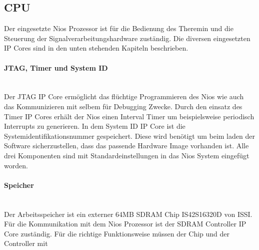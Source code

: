 \subsection{CPU}\label{subsec:CPU}
Der eingesetzte Nios Prozessor ist für die Bedienung des Theremin und die Steuerung der Signalverarbeitungshardware zuständig. Die diversen eingesetzten IP Cores sind in den unten stehenden Kapiteln beschrieben.

\paragraph{JTAG, Timer und System ID}\mbox{}\\
Der JTAG IP Core ermöglicht das flüchtige Programmieren des Nios wie auch das Kommunizieren mit selbem für Debugging Zwecke. 
Durch den einsatz des Timer IP Cores erhält der Nios einen Interval Timer um beispielsweise periodisch Interrupts zu generieren. 
In dem System ID IP Core ist die Systemidentifikationsnummer gespeichert. Diese wird benötigt um beim laden der Software sicherzustellen, dass das passende Hardware Image vorhanden ist.
Alle drei Komponenten sind mit Standardeinstellungen in das Nios System eingefügt worden.

\paragraph{Speicher}\mbox{}\\

Der Arbeitsspeicher ist ein externer 64MB SDRAM Chip IS42S16320D von ISSI. Für die Kommunikation mit dem Nios Prozessor ist der SDRAM Controller IP Core zuständig. Für die richtige Funktionsweise müssen der Chip und der Controller mit 
